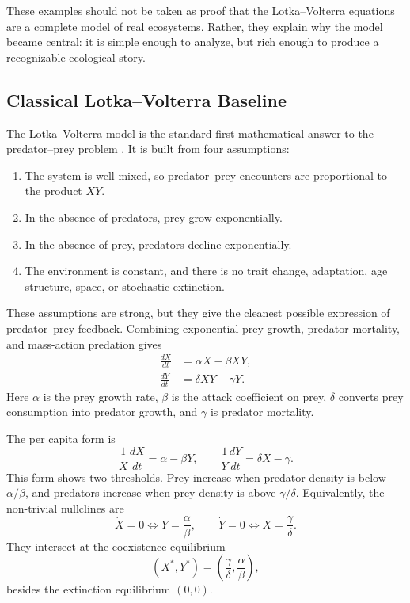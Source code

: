 \documentclass[12pt,letterpaper]{article}
\numberwithin{equation}{section}
\begin{document}
These examples should not be taken as proof that the Lotka--Volterra equations are a
complete model of real ecosystems. Rather, they explain why the model became central:
it is simple enough to analyze, but rich enough to produce a recognizable ecological
story.

\subsection{Classical Lotka--Volterra Baseline}

The Lotka--Volterra model is the standard first mathematical answer to the
predator--prey problem \cite{murray2002,kot2001,edelstein2005}. It is built from
four assumptions:

\begin{enumerate}[leftmargin=2.2em]
    \item The system is well mixed, so predator--prey encounters are proportional to
    the product $XY$.
    \item In the absence of predators, prey grow exponentially.
    \item In the absence of prey, predators decline exponentially.
    \item The environment is constant, and there is no trait change, adaptation, age
    structure, space, or stochastic extinction.
\end{enumerate}

These assumptions are strong, but they give the cleanest possible expression of
predator--prey feedback. Combining exponential prey growth, predator mortality, and
mass-action predation gives
\begin{equation}
\boxed{
\begin{aligned}
    \frac{dX}{dt} &= \alpha X-\beta XY,\\
    \frac{dY}{dt} &= \delta XY-\gamma Y.
\end{aligned}}
\label{eq:lotka-volterra}
\end{equation}
Here $\alpha$ is the prey growth rate, $\beta$ is the attack coefficient on prey,
$\delta$ converts prey consumption into predator growth, and $\gamma$ is predator
mortality.

The per capita form is
\begin{equation}
    \frac{1}{X}\frac{dX}{dt}=\alpha-\beta Y,
    \qquad
    \frac{1}{Y}\frac{dY}{dt}=\delta X-\gamma.
\end{equation}
This form shows two thresholds. Prey increase when predator density is below
$\alpha/\beta$, and predators increase when prey density is above $\gamma/\delta$.
Equivalently, the non-trivial nullclines are
\begin{equation}
    \dot X=0 \Longleftrightarrow Y=\frac{\alpha}{\beta},
    \qquad
    \dot Y=0 \Longleftrightarrow X=\frac{\gamma}{\delta}.
\end{equation}
They intersect at the coexistence equilibrium
\begin{equation}
    (X^*,Y^*)=\left(\frac{\gamma}{\delta},\frac{\alpha}{\beta}\right),
\end{equation}
besides the extinction equilibrium $(0,0)$.
\end{document}
